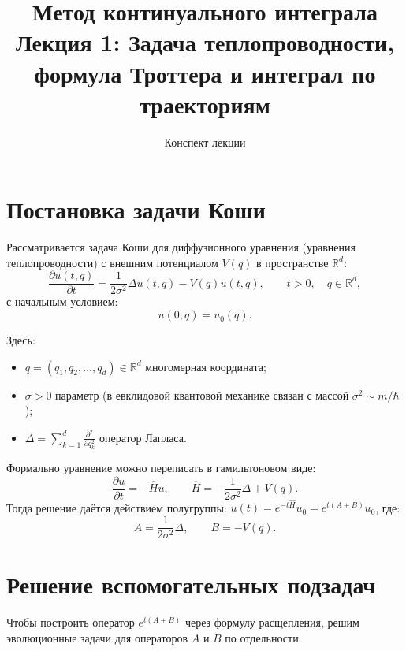 \documentclass[12pt,a4paper]{article}
\title{\textbf{Метод континуального интеграла}\\
\large Лекция 1: Задача теплопроводности, формула Троттера и интеграл по траекториям}
\author{Конспект лекции}
\date{}
\begin{document}
\maketitle

\section{Постановка задачи Коши}

Рассматривается задача Коши для диффузионного уравнения (уравнения теплопроводности) с внешним потенциалом $V(q)$ в пространстве $\mathbb{R}^d$:
\begin{equation}
    \label{eq:heat_full}
    \frac{\partial u(t, q)}{\partial t} = \frac{1}{2\sigma^2} \Delta u(t, q) - V(q) u(t, q), \qquad t > 0, \quad q \in \mathbb{R}^d,
\end{equation}
с начальным условием:
\begin{equation}
    \label{eq:heat_ic}
    u(0, q) = u_0(q).
\end{equation}

Здесь:
\begin{itemize}
    \item $q = (q_1, q_2, \dots, q_d) \in \mathbb{R}^d$  многомерная координата;
    \item $\sigma > 0$  параметр (в евклидовой квантовой механике связан с массой $\sigma^2 \sim m/\hbar$);
    \item $\Delta = \sum\limits_{k=1}^d \frac{\partial^2}{\partial q_k^2}$  оператор Лапласа.
\end{itemize}

Формально уравнение можно переписать в гамильтоновом виде:
\begin{equation}
    \frac{\partial u}{\partial t} = -\hat{H} u, \qquad \hat{H} = -\frac{1}{2\sigma^2}\Delta + V(q).
\end{equation}
Тогда решение даётся действием полугруппы: $u(t) = e^{-t\hat{H}} u_0 = e^{t(A+B)}u_0$, где:
\begin{equation}
    A = \frac{1}{2\sigma^2} \Delta, \qquad B = -V(q).
\end{equation}



\section{Решение вспомогательных подзадач}

Чтобы построить оператор $e^{t(A+B)}$ через формулу расщепления, решим эволюционные задачи для операторов $A$ и $B$ по отдельности.
\end{document}
